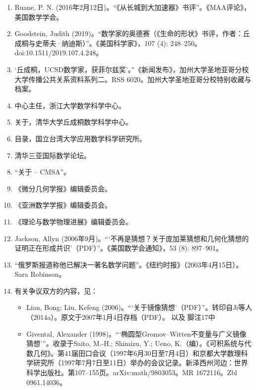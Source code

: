 \begin{enumerate}
\item Ruane, P. N. (2016年2月12日)。“《从长城到大加速器》书评”。《MAA评论》，美国数学学会。  
\item Goodstein, Judith (2019)。“数学家的奥德赛（《生命的形状》书评，作者：丘成桐与史蒂夫·纳迪斯）”。《美国科学家》，107 (4): 248–250。doi:10.1511/2019.107.4.248。
\item ‘丘成桐，UCSD数学家，获菲尔兹奖’。”《新闻发布》，加州大学圣地亚哥分校大学传播公共关系资料系列二。RSS 6020。加州大学圣地亚哥分校特别收藏与档案。  
\item 中心主任，浙江大学数学科学中心。  
\item 关于，清华大学丘成桐数学科学中心。  
\item 目录，国立台湾大学应用数学科学研究所。  
\item 清华三亚国际数学论坛。  
\item “关于 – CMSA”。  
\item 《微分几何学报》编辑委员会。  
\item 《亚洲数学学报》编辑委员会。  
\item 《理论与数学物理进展》编辑委员会。
\item Jackson, Allyn (2006年9月)。“‘不再是猜想？关于庞加莱猜想和几何化猜想的证明正在形成共识’（PDF）”。《美国数学会通知》，53 (8): 897–901。  
\item “俄罗斯报道称他已解决一著名数学问题”。《纽约时报》（2003年4月15日）。Sara Robinson。  
\item 有关争议双方的内容，见：  
\begin{itemize}
\item Lian, Bong; Liu, Kefeng (2006)。“‘关于镜像猜想’（PDF）”。转印自Ji等人（2014a）。原文于2007年1月4日存档（PDF）。  
以及  
脚注17中  
\item Givental, Alexander (1998)。“‘椭圆型Gromov–Witten不变量与广义镜像猜想’”。收录于Saito, M.-H.; Shimizu, Y.; Ueno, K.（编）。《可积系统与代数几何》。第41届田口会议（1997年6月30日至7月4日）和京都大学数理科学研究所（1997年7月7日至11日）举办的会议记录。新泽西州河边：世界科学出版社。第107–155页。arXiv:math/9803053。MR 1672116。Zbl 0961.14036。
\end{itemize}
\end{enumerate}
